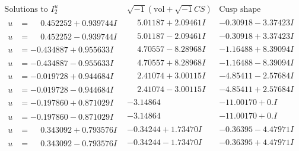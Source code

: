 \documentclass[1p]{elsarticle_modified}
\theoremstyle{definition}
\newcommand{\I}{\sqrt{-1}}
\begin{document}
$$\begin{array}{c|c|c}  
\text{Solutions to }I^u_{2}& \I (\text{vol} + \sqrt{-1}CS) & \text{Cusp shape}\\
 \hline 
\begin{aligned}
u &= \phantom{-}0.452252 + 0.939744 I\end{aligned}
 & \phantom{-}5.01187 + 2.09461 I & -0.30918 - 3.37423 I \\ \hline\begin{aligned}
u &= \phantom{-}0.452252 - 0.939744 I\end{aligned}
 & \phantom{-}5.01187 - 2.09461 I & -0.30918 + 3.37423 I \\ \hline\begin{aligned}
u &= -0.434887 + 0.955633 I\end{aligned}
 & \phantom{-}4.70557 - 8.28968 I & -1.16488 + 8.39094 I \\ \hline\begin{aligned}
u &= -0.434887 - 0.955633 I\end{aligned}
 & \phantom{-}4.70557 + 8.28968 I & -1.16488 - 8.39094 I \\ \hline\begin{aligned}
u &= -0.019728 + 0.944684 I\end{aligned}
 & \phantom{-}2.41074 + 3.00115 I & -4.85411 - 2.57684 I \\ \hline\begin{aligned}
u &= -0.019728 - 0.944684 I\end{aligned}
 & \phantom{-}2.41074 - 3.00115 I & -4.85411 + 2.57684 I \\ \hline\begin{aligned}
u &= -0.197860 + 0.871029 I\end{aligned}
 & -3.14864\phantom{ +0.000000I} & -11.00170 + 0. I\phantom{ +0.000000I} \\ \hline\begin{aligned}
u &= -0.197860 - 0.871029 I\end{aligned}
 & -3.14864\phantom{ +0.000000I} & -11.00170 + 0. I\phantom{ +0.000000I} \\ \hline\begin{aligned}
u &= \phantom{-}0.343092 + 0.793576 I\end{aligned}
 & -0.34244 + 1.73470 I & -0.36395 - 4.47971 I \\ \hline\begin{aligned}
u &= \phantom{-}0.343092 - 0.793576 I\end{aligned}
 & -0.34244 - 1.73470 I & -0.36395 + 4.47971 I \\ \hline\begin{aligned}

\end{aligned}
\end{array}$$
\end{document}
